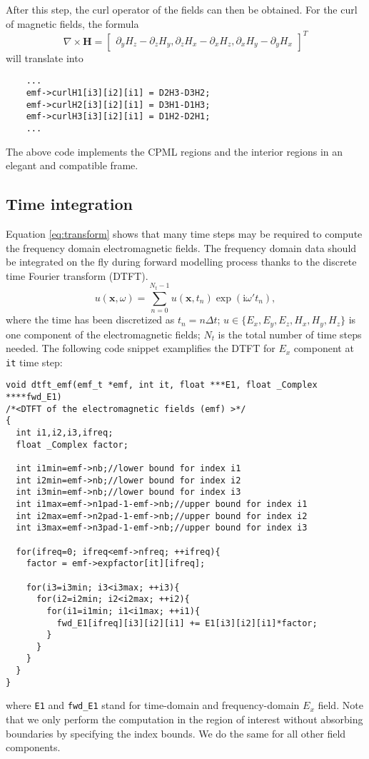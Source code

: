 \documentclass[a4paper,10pt]{article}
\begin{document}
After this step, the curl operator of the fields can then be obtained. For the curl of magnetic fields, the formula
\begin{displaymath}
  \nabla\times \mathbf{H}=\begin{bmatrix}
  \partial_y H_z-\partial_z H_y,
  \partial_z H_x-\partial_x H_z,
  \partial_x H_y-\partial_y H_x\end{bmatrix}^T
\end{displaymath}
will translate into
\begin{verbatim}
    ...
    emf->curlH1[i3][i2][i1] = D2H3-D3H2;
    emf->curlH2[i3][i2][i1] = D3H1-D1H3;
    emf->curlH3[i3][i2][i1] = D1H2-D2H1;
    ...
\end{verbatim}
The above code implements the CPML regions and the interior regions in an elegant and compatible frame.


\subsection{Time integration}

Equation \eqref{eq:transform} shows that many time steps may be required to compute the frequency domain electromagnetic fields.  The frequency domain data should be integrated on the fly during forward modelling process thanks to the discrete time Fourier transform (DTFT).
\begin{equation}
u(\mathbf{x},\omega)=\sum_{n=0}^{N_t-1} u(\mathbf{x},t_n) \exp(\mathrm{i}\omega' t_n),
\end{equation}
where the time has been discretized as $t_n=n\Delta t$; $u\in\{E_x,E_y,E_z,H_x, H_y,H_z\}$ is one component of the electromagnetic fields; $N_t$ is the total number of time steps needed. The following code snippet examplifies the DTFT for $E_x$ component at \verb|it| time step:
\begin{verbatim}
void dtft_emf(emf_t *emf, int it, float ***E1, float _Complex ****fwd_E1)
/*<DTFT of the electromagnetic fields (emf) >*/
{
  int i1,i2,i3,ifreq;
  float _Complex factor;
  
  int i1min=emf->nb;//lower bound for index i1
  int i2min=emf->nb;//lower bound for index i2
  int i3min=emf->nb;//lower bound for index i3
  int i1max=emf->n1pad-1-emf->nb;//upper bound for index i1
  int i2max=emf->n2pad-1-emf->nb;//upper bound for index i2
  int i3max=emf->n3pad-1-emf->nb;//upper bound for index i3

  for(ifreq=0; ifreq<emf->nfreq; ++ifreq){
    factor = emf->expfactor[it][ifreq];

    for(i3=i3min; i3<i3max; ++i3){
      for(i2=i2min; i2<i2max; ++i2){
        for(i1=i1min; i1<i1max; ++i1){
          fwd_E1[ifreq][i3][i2][i1] += E1[i3][i2][i1]*factor;
        }
      }
    }
  }
}
\end{verbatim}
where \verb|E1| and \verb|fwd_E1| stand for time-domain and frequency-domain $E_x$ field. Note that we only perform the computation in the region of interest without absorbing boundaries by specifying the index bounds. We do the same for all other field components.
\end{document}
